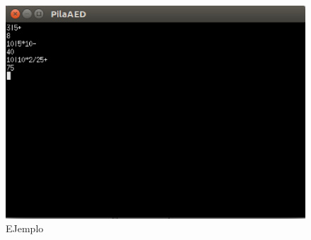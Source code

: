 \documentclass[a4paper,12pt]{article}
\begin{document}
\begin{figure}[h]
 \centering
 \includegraphics[scale=0.5]{imagenes/1.eps}
 \caption{EJemplo}
\end{figure}
\end{document}
